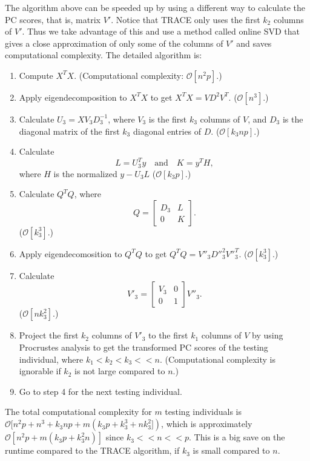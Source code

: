 \documentclass{article}[12pt]
\newcommand{\bO}{\mathcal{O}}
\begin{document}
The algorithm above can be speeded up by using a different way to calculate the PC scores, that is, matrix $V'$.
Notice that TRACE only uses the first $k_2$ columns of $V'$.
Thus we take advantage of this and use a method called online SVD that gives a close approximation of only some of the columns of $V'$ and saves computational complexity.
The detailed algorithm is:

\begin{enumerate}
\item Compute $X^T X$.
  (Computational complexity: $\bO[n^2p]$.)  
\item Apply eigendecomposition to $X^T X$ to get $X^T X = V D^2 V^T$.
  ($\bO[n^3]$.)
\item Calculate $U_3 = X V_3 D_3^{-1}$,
  where $V_3$ is the first $k_3$ columns of $V$,
  and $D_3$ is the diagonal matrix of the first $k_3$ diagonal entries of $D$.
  ($\bO[k_3 n p]$.)
\item Calculate 
  \[
    L = U_3^T y \quad \text{and} \quad K = y^T H,
  \]
  where $H$ is the normalized  $y - U_3L$
  ($\bO[k_3 p]$.)
\item Calculate $Q^T Q$, where
  \[
    Q = 
    \begin{bmatrix}
      D_3 & L \\
      0 & K
    \end{bmatrix}.
  \]
  ($\bO[k_3^3]$.)
\item Apply eigendecomosition to $Q^T Q$ to get $Q^T Q = V''_3 D''^2_3 V''^T_3$.
  ($\bO[k_3^3]$.)
\item Calculate
  \[
    V'_3 =
    \begin{bmatrix}
      V_3 & 0 \\
      0 & 1
    \end{bmatrix}
    V''_3.
  \]
  ($\bO[nk_3^2]$.)
\item Project the first $k_2$ columns of $V'_3$ to the first $k_1$ columns of $V$ by using Procrustes analysis to get the transformed PC scores of the testing individual,
  where $k_1 < k_2  < k_3 << n$.
  (Computational complexity is ignorable if $k_2$ is not large compared to $n$.)
  \item Go to step 4 for the next testing individual.
\end{enumerate}

The total computational complexity for $m$ testing individuals is $\bO[n^2p + n^3 + k_3np + m(k_3p + k_3^3 + nk_3^2])$, which is approximately $\bO[n^2p + m(k_3p + k_3^2n)]$ since $k_3 << n << p$.
This is a big save on the runtime compared to the TRACE algorithm,
if $k_3$ is small compared to $n$.
\end{document}
